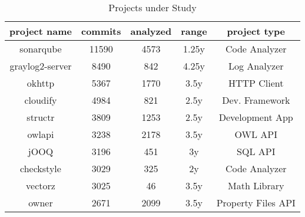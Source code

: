 \begin{table}
	\caption{Projects under Study}
	\label{tableProjects}
	\centering
	\begin{tabular}{ | c | c | c | c | c | }
		\hline
		project name & commits & analyzed & range & project type \\
		\hline
		sonarqube & 11590 & 4573 & 1.25y & Code Analyzer \\
		graylog2-server & 8490 & 842 & 4.25y & Log Analyzer \\
		okhttp & 5367 & 1770 & 3.5y & HTTP Client \\
		cloudify & 4984 & 821 & 2.5y & Dev. Framework \\
		structr & 3809 & 1253 & 2.5y & Development App \\
		owlapi & 3238 & 2178 & 3.5y & OWL API \\
		jOOQ & 3196 & 451 & 3y & SQL API \\
		checkstyle & 3029 & 325 & 2y & Code Analyzer \\
		vectorz & 3025 & 46 & 3.5y & Math Library \\
		owner & 2671 & 2099 & 3.5y & Property Files API \\
		\hline
	\end{tabular}
\end{table}
